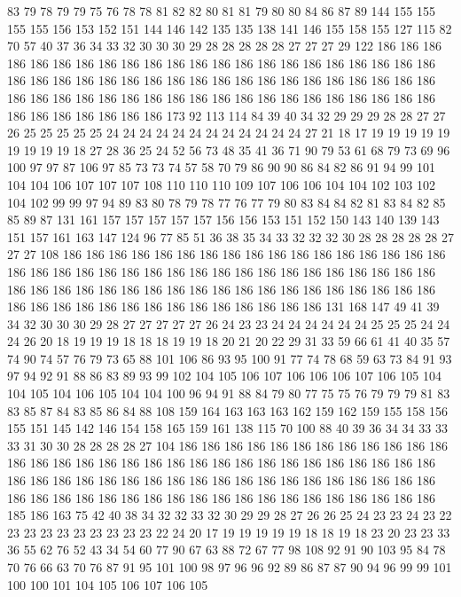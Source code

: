83 79 78 79 79 75 76 78 78 81 82 82 80 81 81 79 80 80 84 86
87 89 144 155 155 155 155 156 153 152 151 144 146 142 135 135 138 141 146 155
158 155 127 115 82 70 57 40 37 36 34 33 32 30 30 30 29 28 28 28
28 28 27 27 27 29 122 186 186 186 186 186 186 186 186 186 186 186 186 186
186 186 186 186 186 186 186 186 186 186 186 186 186 186 186 186 186 186 186 186
186 186 186 186 186 186 186 186 186 186 186 186 186 186 186 186 186 186 186 186
186 186 186 186 186 186 186 186 186 186 186 186 186 186 173 92 113 114 84 39
40 34 32 29 29 29 28 28 27 27 26 25 25 25 25 25 24 24 24 24
24 24 24 24 24 24 24 24 27 21 18 17 19 19 19 19 19 19 19 19
19 18 27 28 36 25 24 52 56 73 48 35 41 36 71 90 79 53 61 68
79 73 69 96 100 97 97 87 106 97 85 73 73 74 57 58 70 79 86 90
90 86 84 82 86 91 94 99 101 104 104 106 107 107 107 108 110 110 110 109
107 106 106 104 104 102 103 102 104 102 99 99 97 94 89 83 80 78 79 78
77 76 77 79 80 83 84 84 82 81 83 84 82 85 85 89 87 131 161 157
157 157 157 157 156 156 153 151 152 150 143 140 139 143 151 157 161 163 147 124
96 77 85 51 36 38 35 34 33 32 32 32 30 28 28 28 28 28 27 27
27 108 186 186 186 186 186 186 186 186 186 186 186 186 186 186 186 186 186 186
186 186 186 186 186 186 186 186 186 186 186 186 186 186 186 186 186 186 186 186
186 186 186 186 186 186 186 186 186 186 186 186 186 186 186 186 186 186 186 186
186 186 186 186 186 186 186 186 186 186 186 131 168 147 49 41 39 34 32 30
30 30 29 28 27 27 27 27 27 26 24 23 23 24 24 24 24 24 24 25
25 25 24 24 24 26 20 18 19 19 19 18 18 18 19 19 18 20 21 20
22 29 31 33 59 66 61 41 40 35 57 74 90 74 57 76 79 73 65 88
101 106 86 93 95 100 91 77 74 78 68 59 63 73 84 91 93 97 94 92
91 88 86 83 89 93 99 102 104 105 106 107 106 106 106 107 106 105 104 104
105 104 106 105 104 104 100 96 94 91 88 84 79 80 77 75 75 76 79 79
79 81 83 83 85 87 84 83 85 86 84 88 108 159 164 163 163 163 162 159
162 159 155 158 156 155 151 145 142 146 154 158 165 159 161 138 115 70 100 88
40 39 36 34 34 33 33 33 31 30 30 28 28 28 28 27 104 186 186 186
186 186 186 186 186 186 186 186 186 186 186 186 186 186 186 186 186 186 186 186
186 186 186 186 186 186 186 186 186 186 186 186 186 186 186 186 186 186 186 186
186 186 186 186 186 186 186 186 186 186 186 186 186 186 186 186 186 186 186 186
186 186 186 186 186 186 185 186 163 75 42 40 38 34 32 32 33 32 30 29
29 28 27 26 26 25 24 23 23 24 23 22 23 23 23 23 23 23 23 23
23 22 24 20 17 19 19 19 19 19 18 18 19 18 23 20 23 23 33 36
55 62 76 52 43 34 54 60 77 90 67 63 88 72 67 77 98 108 92 91
90 103 95 84 78 70 76 66 63 70 76 87 91 95 101 100 98 97 96 96
92 89 86 87 87 90 94 96 99 99 101 100 100 101 104 105 106 107 106 105

